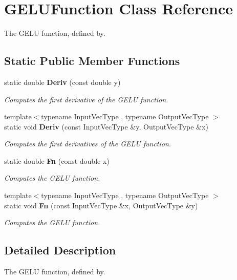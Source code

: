 \section{G\+E\+L\+U\+Function Class Reference}
\label{classmlpack_1_1ann_1_1GELUFunction}


The G\+E\+LU function, defined by.  


\subsection*{Static Public Member Functions}
\begin{DoxyCompactItemize}
\item 
static double \textbf{ Deriv} (const double y)
\begin{DoxyCompactList}\small\item\em Computes the first derivative of the G\+E\+LU function. \end{DoxyCompactList}\item 
{\footnotesize template$<$typename Input\+Vec\+Type , typename Output\+Vec\+Type $>$ }\\static void \textbf{ Deriv} (const Input\+Vec\+Type \&y, Output\+Vec\+Type \&x)
\begin{DoxyCompactList}\small\item\em Computes the first derivatives of the G\+E\+LU function. \end{DoxyCompactList}\item 
static double \textbf{ Fn} (const double x)
\begin{DoxyCompactList}\small\item\em Computes the G\+E\+LU function. \end{DoxyCompactList}\item 
{\footnotesize template$<$typename Input\+Vec\+Type , typename Output\+Vec\+Type $>$ }\\static void \textbf{ Fn} (const Input\+Vec\+Type \&x, Output\+Vec\+Type \&y)
\begin{DoxyCompactList}\small\item\em Computes the G\+E\+LU function. \end{DoxyCompactList}\end{DoxyCompactItemize}


\subsection{Detailed Description}
The G\+E\+LU function, defined by. 

